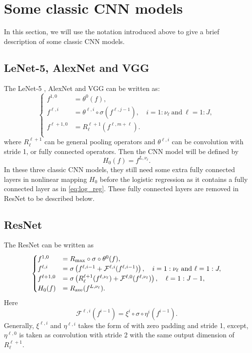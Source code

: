 \section{Some classic CNN models}\label{sec:CNNs}
In this section, we will use the notation introduced above to 
give a brief description of some classic CNN models.

\subsection{LeNet-5, AlexNet and VGG}
The  LeNet-5 \cite{lecun1998gradient}, AlexNet \cite{krizhevsky2012imagenet} and VGG \cite{simonyan2014very}
can be written as:
	\begin{equation}
	\begin{cases}
	f^{1,0} &= \theta^0(f), \\
	f^{\ell,i} &= \theta^{\ell,i} \circ \sigma (f^{\ell, j-1}), \quad i = 1:\nu_\ell ~\text{and}~ \ell = 1:J,\\
	f^{\ell+1,0} &= R_\ell^{\ell+1}( f^{\ell,m+\ell}).  \\
	\end{cases}
	\end{equation}
	where $R_\ell^{\ell+1}$ can be general pooling operators and $\theta^{\ell,i}$ can be convolution with stride 1, 
	or fully connected operators.  
	Then the CNN model will be defined by
	\begin{equation}\label{eq:cnndefine}
	H_0(f) = f^{L,\nu_\ell}.
	\end{equation}
	In these three classic CNN models, they still need some 
	extra fully connected layers in nonlinear mapping $H_0$ before the logistic regression as it contains 
	a fully connected layer as in \eqref{eq:log_reg}. 
	These fully connected layers are removed in ResNet to be described below.
\subsection{ResNet}
The ResNet \cite{he2016deep} can be written as
	\begin{equation}\label{ori-ResNet}
	\begin{cases}
	f^{1,0} &=R_{\rm max}\circ \sigma \circ \theta^0(f), \\
	f^{\ell,i} &= \sigma \left( f^{\ell, i-1} + \mathcal{F}^{\ell, i} (f^{\ell,i-1}) \right), \quad i = 1:\nu_\ell ~\text{and}~ \ell = 1:J ,\\
	f^{\ell+1,0} &= \sigma \left( R_\ell^{\ell+1} (f^{\ell, \nu_\ell} )+ \mathcal{F}^{\ell, 0} (f^{\ell, \nu_\ell} ) \right), \quad \ell = 1:J-1,\\
	H_0(f) &=  R_{\rm ave}(f^{L,\nu_\ell}). \\
	\end{cases}
	\end{equation}
	Here
	$$
	\mathcal{F}^{\ell,i} (f^{i-1}) = \xi^{i} \circ \sigma \circ \eta^{i} (f^{i-1}).
	$$
	Generally, $\xi^{\ell,i}$ and $\eta^{\ell,i}$ takes the form of \label{eq:conv-1} with zero padding and stride 1,
	except, $\eta^{\ell,0}$  is taken as convolution with stride 2 with the same output dimension of $R_\ell^{\ell+1}$.
	
